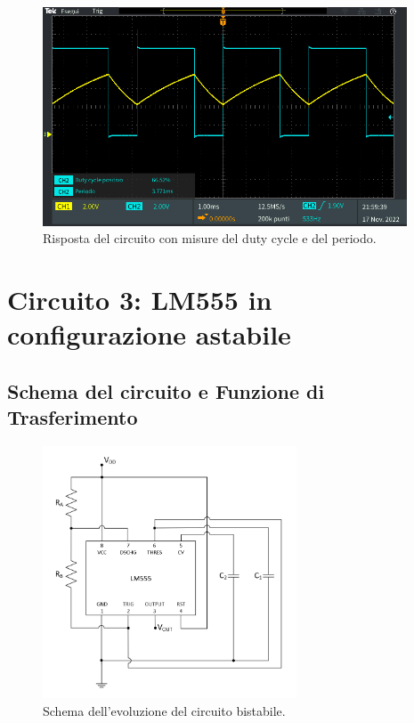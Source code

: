 \documentclass{report}
\begin{document}
\begin{figure}[h!]
	\centering
	\includegraphics[height=6.5cm]{immagini/TEK00019}
	\caption{Risposta del circuito con misure del duty cycle e del periodo.}
	\label{figura:TEK00019}
\end{figure}

\newpage
\section{Circuito 3: LM555 in configurazione astabile}
\subsection{Schema del circuito e Funzione di Trasferimento}
\begin{figure}[h!]
	\centering
	\includegraphics[height=7.5cm]{immagini/schema3}
	\caption{Schema dell'evoluzione del circuito bistabile.}
	\label{figura:schema3}
\end{figure}
\end{document}
